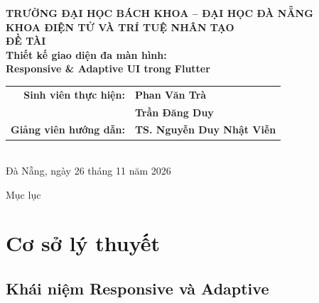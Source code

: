 \documentclass[aspectratio=169,10pt]{beamer}
\begin{document}
\begin{frame}[plain]
  \centering
  \vspace{0.2cm}
  {\large\bfseries TRƯỜNG ĐẠI HỌC BÁCH KHOA -- ĐẠI HỌC ĐÀ NẴNG}\\[3pt]
  {\large\bfseries KHOA ĐIỆN TỬ VÀ TRÍ TUỆ NHÂN TẠO}\\[22pt]
  {\normalsize\bfseries ĐỀ TÀI}\\[5pt]
  {\LARGE\bfseries Thiết kế giao diện đa màn hình:\\ Responsive \& Adaptive UI trong Flutter}\\[14pt]
  \begin{tabular}{rl}
    \textbf{Sinh viên thực hiện:} & \textbf{Phan Văn Trà}\\
                                  & \textbf{Trần Đăng Duy}\\[4pt]
    \textbf{Giảng viên hướng dẫn:} & \textbf{TS. Nguyễn Duy Nhật Viễn}
  \end{tabular}\\[14pt]
  {\normalsize Đà Nẵng, ngày 26 tháng 11 năm 2026}
\end{frame}

\begin{frame}{Mục lục}
  \vspace{6pt}
  \large
  \tableofcontents[subsubsectionstyle=hide]
\end{frame}

\section{Cơ sở lý thuyết}
\subsection{Khái niệm Responsive và Adaptive}
\end{document}
